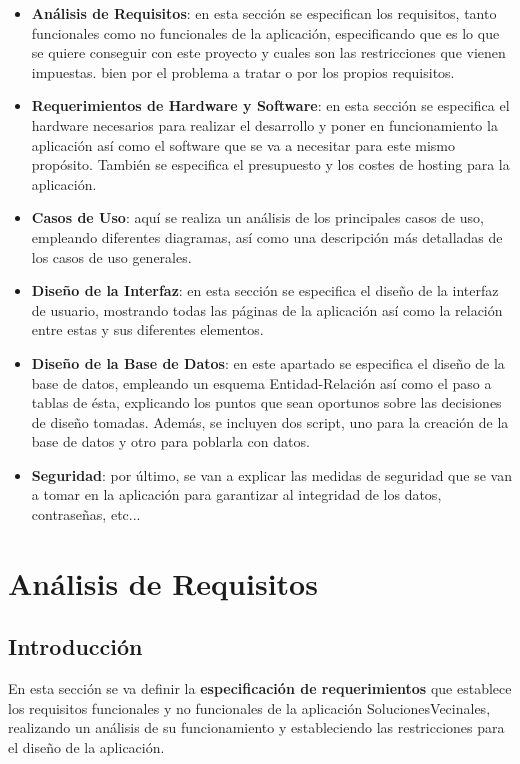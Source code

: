 \begin{itemize}
	\item \textbf{Análisis de Requisitos}: en esta sección se especifican los requisitos, tanto funcionales como no funcionales de la aplicación, especificando que es lo que se quiere conseguir con este proyecto y cuales son las restricciones que vienen impuestas. bien por el problema a tratar o por los propios requisitos.
	
	\item \textbf{Requerimientos de Hardware y Software}: en esta sección se especifica el hardware necesarios para realizar el desarrollo y poner en funcionamiento la aplicación así como el software que se va a necesitar para este mismo propósito. También se especifica el presupuesto y los costes de hosting para la aplicación.
	
	\item \textbf{Casos de Uso}: aquí se realiza un análisis de los principales casos de uso, empleando diferentes diagramas, así como una descripción más detalladas de los casos de uso generales.
	
	\item \textbf{Diseño de la Interfaz}: en esta sección se especifica el diseño de la interfaz de usuario, mostrando todas las páginas de la aplicación así como la relación entre estas y sus diferentes elementos.
	
	\item \textbf{Diseño de la Base de Datos}: en este apartado se especifica el diseño de la base de datos, empleando un esquema Entidad-Relación así como el paso a tablas de ésta, explicando los puntos que sean oportunos sobre las decisiones de diseño tomadas. Además, se incluyen dos script, uno para la creación de la base de datos y otro para poblarla con datos.
	
	\item \textbf{Seguridad}: por último, se van a explicar las medidas de seguridad que se van a tomar en la aplicación para
	garantizar al integridad de los datos, contraseñas, etc...
\end{itemize}



\section{Análisis de Requisitos}

\subsection{Introducción}
En esta sección se va definir la \textbf{especificación de requerimientos} que establece los requisitos funcionales y no funcionales de la aplicación SolucionesVecinales, realizando un análisis de su funcionamiento y estableciendo las restricciones para el diseño de la aplicación.

